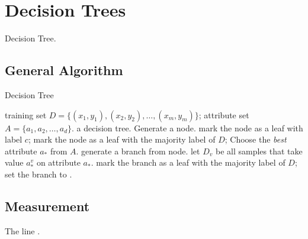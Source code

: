 \section{Decision Trees}
Decision Tree.

\subsection{General Algorithm}
\begin{algorithm}
    \caption{Decision Tree}\label{decision_tree}
    \begin{algorithmic}[1]
        \Require training set $D = \{(x_1, y_1), (x_2, y_2), \ldots, (x_m, y_m)
        \}$; attribute set $A = \{a_1, a_2, \ldots, a_d\}$.
        \Ensure a decision tree.
            \State Generate a node.
             
                \State mark the node as a leaf with label $c$; \Return
            \EndIf
                \State mark the node as a leaf with the majority label of $D$; 
                \Return
            \EndIf
            \State Choose the \textit{best} attribute $a_*$ from $A$.\label{measurement}
                \State generate a branch from node.
                \State let $D_v$ be all samples that take value $a_*^v$ on attribute
                $a_*$.
                 
                    \State mark the branch as a leaf with the majority label of 
                    $D$; \Return
                \Else
                    \State set the branch to .
                \EndIf
            \EndFor
        \EndProcedure
    \end{algorithmic}
\end{algorithm}

\subsection{Measurement}

The line . 